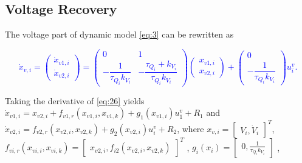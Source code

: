 \documentclass[]{interact}
\theoremstyle{plain}%
\theoremstyle{definition}
\theoremstyle{remark}
\begin{document}
\subsection{Voltage Recovery}
The voltage part of dynamic model \eqref{eq:3} can be rewritten as 

\textcolor{blue}{
\begin{equation}
\label{eq:26}
\dot{x}_{v,i} =
\begin{pmatrix} \dot{x}_{v1,i} \\ \dot{x}_{v2,i} \end{pmatrix}
=
\begin{pmatrix}
0 & 1 \\
-\dfrac{1}{\tau_{Q_i}k_{V_i}} & -\dfrac{\tau_{Q_i} + k_{V_i}}{\tau_{Q_i}k_{V_i}}
\end{pmatrix}
\begin{pmatrix} x_{v1,i} \\ x_{v2,i} \end{pmatrix}
+
\begin{pmatrix} 0 \\ -\dfrac{1}{\tau_{Q_i}k_{V_i}} \end{pmatrix} u_i^v .
\end{equation}
}


Taking the derivative of \eqref{eq:26} yields $\dot{x}_{v1,i}= x_{v2,i} + f_{v1,r}(x_{v1,i}, x_{v1,k}) + g_1(x_{v1,i}) u_1^v + R_1$ and $\dot{x}_{v2,i} = f_{v2,r}(x_{v2,i}, x_{v2,k}) + g_2(x_{v2,i}) u_i^v + R_2$, where \( x_{v,i} = \begin{bmatrix} V_i,\dot{V}_i \end{bmatrix}^T \), \( f_{vi,r}(x_{vi,i}, x_{vi,k}) = \begin{bmatrix} x_{v2,i},f_{i2}(x_{v2,i}, x_{v2,k}) \end{bmatrix}^T \) , \( g_i(x_i) = \begin{bmatrix} 0 ,\frac{1}{\tau_{Q_i} k_{V_i}} \end{bmatrix} \) , 
\end{document}
